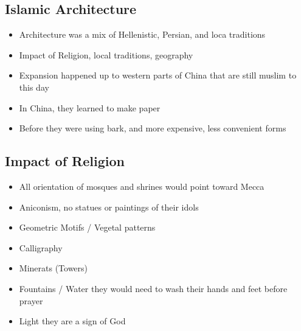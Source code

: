 \documentclass{article}
\begin{document}
\subsection{Islamic Architecture}
\begin{itemize}
\item Architecture was a mix of
  Hellenistic, Persian, and loca traditions
\item Impact of Religion, local traditions, geography
\item Expansion happened up to western parts of China that
  are still muslim to this day
\item In China, they learned to make paper
\item Before they were using bark, and more expensive,
  less convenient forms
\end{itemize}

\subsection{Impact of Religion}
\begin{itemize}
  \item All orientation of mosques and shrines would point toward Mecca
  \item Aniconism, no statues or paintings of their idols
  \item Geometric Motifs / Vegetal patterns
  \item Calligraphy
  \item Minerats (Towers)
  \item Fountains / Water \rightarrow{} they would need to wash their hands and
    feet before prayer
  \item Light \rightarrow{} they are a sign of God
\end{itemize}
\end{document}
